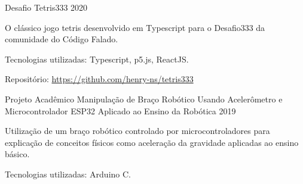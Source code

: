 \begin{cventries}
  \cventry
  {Desafio} %
  {Tetris333} %
  {} %
  {2020} %
  {
    \begin{cvitems} %
      \item {O clássico jogo tetris desenvolvido em Typescript para o Desafio333 da comunidade do Código Falado.}
      \item {Tecnologias utilizadas: Typescript,  p5.js, ReactJS.}
      \item {Repositório: \url{https://github.com/henry-ns/tetris333}}
    \end{cvitems}
  }

  \cventry
  {Projeto Acadêmico} %
  {Manipulação de Braço Robótico Usando Acelerômetro e Microcontrolador ESP32 Aplicado ao Ensino da Robótica} %
  {} %
  {2019} %
  {
    \begin{cvitems} %
      \item {Utilização de um braço robótico controlado por microcontroladores para explicação de conceitos físicos como aceleração da gravidade aplicadas ao ensino básico.}
      \item {Tecnologias utilizadas: Arduino C.}
    \end{cvitems}
  }


\end{cventries}